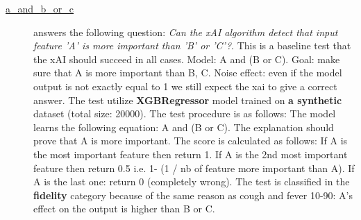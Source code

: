 \begin{description}
\item[\href{https://github.com/Karim-53/Compare-xAI/tree/main/tests/a_and_b_or_c.py}{a\_and\_b\_or\_c}] answers the following question: \emph{Can the xAI algorithm detect that input feature 'A' is more important than 'B' or 'C'?}.
This is a baseline test that the xAI should succeed in all cases. Model: A and (B or C). Goal: make sure that A is more important than B, C. Noise effect: even if the model output is not exactly equal to 1 we still expect the xai to give a correct answer.
 The test utilize \textbf{XGBRegressor} model trained on \textbf{a synthetic} dataset (total size: 20000).
 The test procedure is as follows: The model learns the following equation: A and (B or C). The explanation should prove that A is more important.
 The score is calculated as follows: If A is the most important feature then return 1. If A is the 2nd most important feature then return 0.5 i.e. 1- (1 / nb of feature more important than A).  If A is the last one: return 0 (completely wrong).
 The test is classified in the \textbf{fidelity} category because of the same reason as cough and fever 10-90: A's effect on the output is higher than B or C.

\end{description}